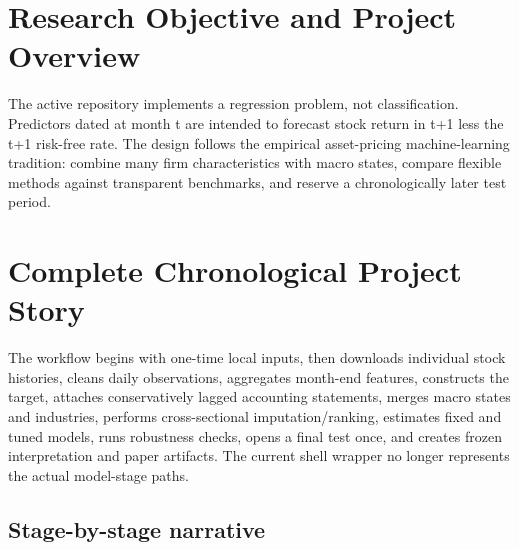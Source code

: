 \documentclass[
  11pt,
  a4paper]{article}
\begin{document}
\section{Research Objective and Project Overview}\label{sec-01}

The active repository implements a regression problem, not
classification. Predictors dated at month t are intended to forecast
stock return in t+1 less the t+1 risk-free rate. The design follows the
empirical asset-pricing machine-learning tradition: combine many firm
characteristics with macro states, compare flexible methods against
transparent benchmarks, and reserve a chronologically later test period.

\section{Complete Chronological Project Story}\label{sec-02}

The workflow begins with one-time local inputs, then downloads
individual stock histories, cleans daily observations, aggregates
month-end features, constructs the target, attaches conservatively
lagged accounting statements, merges macro states and industries,
performs cross-sectional imputation/ranking, estimates fixed and tuned
models, runs robustness checks, opens a final test once, and creates
frozen interpretation and paper artifacts. The current shell wrapper no
longer represents the actual model-stage paths.

\subsection{Stage-by-stage narrative}\label{sec-story-stages}
\end{document}
